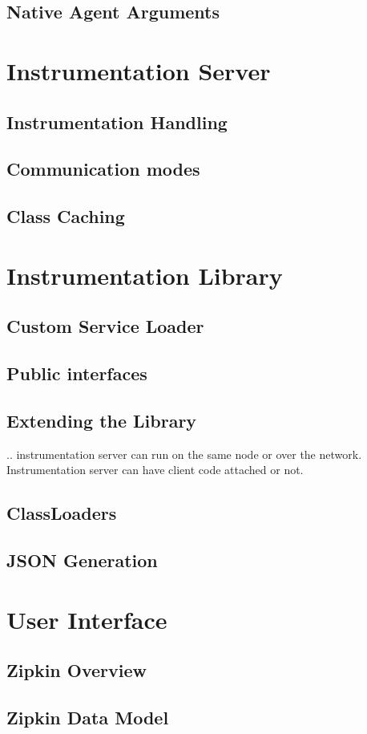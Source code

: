 \documentclass[12pt,a4paper]{report}
\begin{document}
\section{Native Agent Arguments}
\chapter{Instrumentation Server}
\section{Instrumentation Handling}
\section{Communication modes}
\section{Class Caching}
\chapter{Instrumentation Library}
\section{Custom Service Loader}
\section{Public interfaces}
\section{Extending the Library}
.. instrumentation server can run on the same node or over the network. Instrumentation server can have client code attached or not.
\section{ClassLoaders}
\section{JSON Generation}
\chapter{User Interface}
\section{Zipkin Overview}
\section{Zipkin Data Model}
\end{document}
